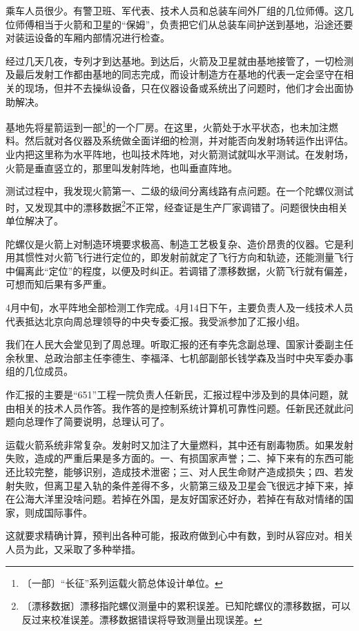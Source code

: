 \documentclass[12pt,UTF-8,openany]{ctexbook}
\begin{document}
\begin{large}
    乘车人员很少。有警卫班、军代表、技术人员和总装车间外厂组的几位师傅。这几位师傅相当于火箭和卫星的“保姆”，负责把它们从总装车间护送到基地，沿途还要对装运设备的车厢内部情况进行检查。
    
    经过几天几夜，专列才到达基地。到达后，火箭及卫星就由基地接管了，一切检测及最后发射工作都由基地的同志完成，而设计制造方在基地的代表一定会坚守在相关的现场，但并不去操纵设备，只在仪器设备或系统出了问题时，他们才会出面协助解决。
    
    基地先将星箭运到一部\footnote{〔一部〕“长征”系列运载火箭总体设计单位。}的一个厂房。在这里，火箭处于水平状态，也未加注燃料。然后就对各仪器及系统做全面详细的检测，并对能否向发射场转运作出评估。业内把这里称为水平阵地，也叫技术阵地，对火箭测试就叫水平测试。在发射场，火箭是垂直竖立的，那里叫发射阵地，也叫垂直阵地。
    
    测试过程中，我发现火箭第一、二级的级间分离线路有点问题。在一个陀螺仪测试时，又发现其中的漂移数据\footnote{〔漂移数据〕漂移指陀螺仪测量中的累积误差。已知陀螺仪的漂移数据，可以反过来校准误差。漂移数据错误将导致测量出现误差。}不正常，经查证是生产厂家调错了。问题很快由相关单位解决了。
    
    陀螺仪是火箭上对制造环境要求极高、制造工艺极复杂、造价昂贵的仪器。它是利用其惯性对火箭飞行进行定位的，即发射前就定了飞行方向和轨迹，还能测量飞行中偏离此“定位”的程度，以便及时纠正。若调错了漂移数据，火箭飞行就有偏差，可想而知后果有多严重。
    
    4月中旬，水平阵地全部检测工作完成。4月14日下午，主要负责人及一线技术人员代表抵达北京向周总理领导的中央专委汇报。我受派参加了汇报小组。
    
    我们在人民大会堂见到了周总理。听取汇报的还有李先念副总理、国家计委副主任余秋里、总政治部主任李德生、李福泽、七机部副部长钱学森及当时中央军委办事组的几位成员。
    
    作汇报的主要是“651”工程一院负责人任新民，汇报过程中涉及到的具体问题，就由相关的技术人员作答。我作答的是控制系统计算机可靠性问题。任新民还就此问题向总理作了简要说明，总理认可了。
    
    运载火箭系统非常复杂。发射时又加注了大量燃料，其中还有剧毒物质。如果发射失败，造成的严重后果是多方面的。一、有损国家声誉；二、掉下来有的东西可能还比较完整，能够识别，造成技术泄密；三、对人民生命财产造成损失；四、若发射失败，但离卫星入轨的条件差得不多，火箭第三级及卫星会飞很远才掉下来，掉在公海大洋里没啥问题。若掉在外国，是友好国家还好办，若掉在有敌对情绪的国家，则成国际事件。
    
    这就要求精确计算，预判出各种可能，报政府做到心中有数，到时从容应对。相关人员为此，又采取了多种举措。
    

\end{large}
\end{document}
